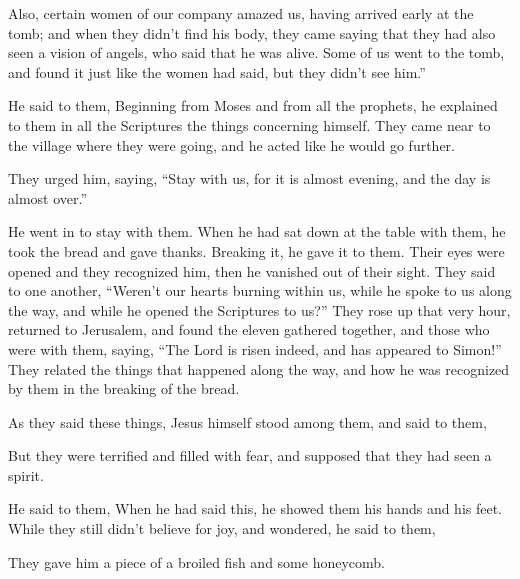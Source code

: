 {Also, certain women of our company amazed us, having arrived early at the tomb;
and when they didn’t find his body, they came saying that they had also seen a vision of angels, who said that he was alive.
Some of us went to the tomb, and found it just like the women had said, but they didn’t see him.”
\par }{\PP {}He said to them,
{}
Beginning from Moses and from all the prophets, he explained to them in all the Scriptures the things concerning himself.
They came near to the village where they were going, and he acted like he would go further.
\par }{\PP {}They urged him, saying, “Stay with us, for it is almost evening, and the day is almost over.”
\par }{\PP He went in to stay with them.
When he had sat down at the table with them, he took the bread and gave thanks. Breaking it, he gave it to them.
Their eyes were opened and they recognized him, then he vanished out of their sight.
They said to one another, “Weren’t our hearts burning within us, while he spoke to us along the way, and while he opened the Scriptures to us?”
They rose up that very hour, returned to Jerusalem, and found the eleven gathered together, and those who were with them,
saying, “The Lord is risen indeed, and has appeared to Simon!”
They related the things that happened along the way, and how he was recognized by them in the breaking of the bread.
\par }{\PP {}As they said these things, Jesus himself stood among them, and said to them,
{}
\par }{\PP {}But they were terrified and filled with fear, and supposed that they had seen a spirit.
\par }{\PP {}He said to them,
{}
When he had said this, he showed them his hands and his feet.
While they still didn’t believe for joy, and wondered, he said to them,
{}
\par }{\PP {}They gave him a piece of a broiled fish and some honeycomb.
}
